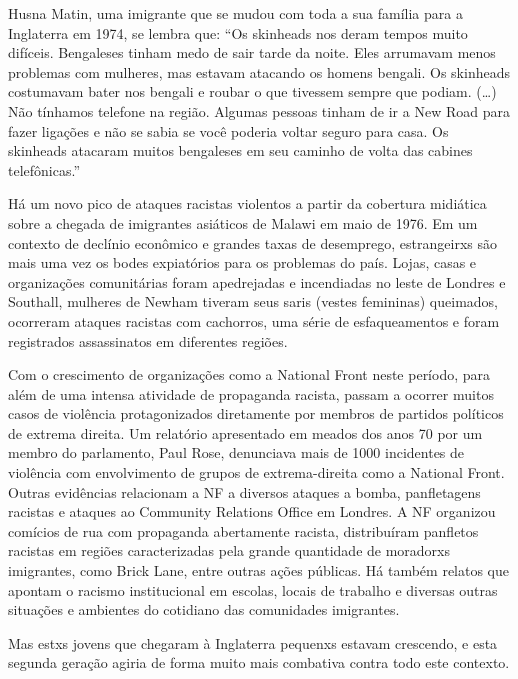 Husna Matin, uma imigrante que se mudou com toda a sua família para a Inglaterra em 1974, se lembra que: “Os skinheads nos deram tempos muito difíceis. Bengaleses tinham medo de sair tarde da noite. Eles arrumavam menos problemas com mulheres, mas estavam atacando os homens bengali. Os skinheads costumavam bater nos bengali e roubar o que tivessem sempre que podiam. (…) Não tínhamos telefone na região. Algumas pessoas tinham de ir a New Road para fazer ligações e não se sabia se você poderia voltar seguro para casa. Os skinheads atacaram muitos bengaleses em seu caminho de volta das cabines telefônicas.”

Há um novo pico de ataques racistas violentos a partir da cobertura midiática sobre a chegada de imigrantes asiáticos de Malawi em maio de 1976. Em um contexto de declínio econômico e grandes taxas de desemprego, estrangeirxs são mais uma vez os bodes expiatórios para os problemas do país. Lojas, casas e organizações comunitárias foram apedrejadas e incendiadas no leste de Londres e Southall, mulheres de Newham tiveram seus saris (vestes femininas) queimados, ocorreram ataques racistas com cachorros, uma série de esfaqueamentos e foram registrados assassinatos em diferentes regiões.

Com o crescimento de organizações como a National Front neste período, para além de uma intensa atividade de propaganda racista, passam a ocorrer muitos casos de violência protagonizados diretamente por membros de partidos políticos de extrema direita. Um relatório apresentado em meados dos anos 70 por um membro do parlamento, Paul Rose, denunciava mais de 1000 incidentes de violência com envolvimento de grupos de extrema-direita como a National Front. Outras evidências relacionam a NF a diversos ataques a bomba, panfletagens racistas e ataques ao Community Relations Office em Londres. A NF organizou comícios de rua com propaganda abertamente racista, distribuíram panfletos racistas em regiões caracterizadas pela grande quantidade de moradorxs imigrantes, como Brick Lane, entre outras ações públicas. Há também relatos que apontam o racismo institucional em escolas, locais de trabalho e diversas outras situações e ambientes do cotidiano das comunidades imigrantes.

Mas estxs jovens que chegaram à Inglaterra pequenxs estavam crescendo, e esta segunda geração agiria de forma muito mais combativa contra todo este contexto.


